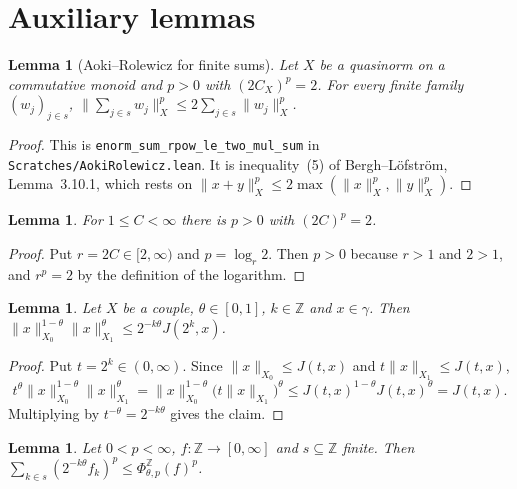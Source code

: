\documentclass[11pt]{article}
\newtheorem{lemma}[theorem]{Lemma}
\theoremstyle{definition}
\theoremstyle{remark}
\newcommand{\norm}[2]{\lVert #1\rVert_{#2}}
\newcommand{\Z}{\mathbb Z}
\begin{document}
\section{Auxiliary lemmas}

\begin{lemma}[Aoki--Rolewicz for finite sums]\label{lem:B}
  Let \(X\) be a quasinorm on a commutative monoid and \(p>0\) with \((2C_X)^p = 2\). For
  every finite family \((w_j)_{j\in s}\),
  \(\norm{\sum_{j\in s} w_j}{X}^p \le 2\sum_{j\in s}\norm{w_j}{X}^p\).
\end{lemma}

\begin{proof}
  This is \texttt{enorm\_sum\_rpow\_le\_two\_mul\_sum} in \texttt{Scratches/AokiRolewicz.lean}.
  It is inequality~(5) of Bergh--L\"ofstr\"om, Lemma~3.10.1, which rests on
  \(\norm{x+y}{X}^p \le 2\max(\norm{x}{X}^p,\norm{y}{X}^p)\).
\end{proof}

\begin{lemma}\label{lem:p}
  For \(1\le C<\infty\) there is \(p>0\) with \((2C)^p = 2\).
\end{lemma}

\begin{proof}
  Put \(r = 2C\in[2,\infty)\) and \(p = \log_r 2\). Then \(p>0\) because \(r>1\) and \(2>1\),
  and \(r^p = 2\) by the definition of the logarithm.
\end{proof}

\begin{lemma}\label{lem:C}
  Let \(X\) be a couple, \(\theta\in[0,1]\), \(k\in\Z\) and \(x\in\gamma\). Then
  \(\norm{x}{X_0}^{1-\theta}\norm{x}{X_1}^{\theta} \le 2^{-k\theta}J(2^k,x)\).
\end{lemma}

\begin{proof}
  Put \(t = 2^k\in(0,\infty)\). Since \(\norm{x}{X_0}\le J(t,x)\) and
  \(t\norm{x}{X_1}\le J(t,x)\),
  \[
    t^\theta\norm{x}{X_0}^{1-\theta}\norm{x}{X_1}^{\theta}
    = \norm{x}{X_0}^{1-\theta}\bigl(t\norm{x}{X_1}\bigr)^{\theta}
    \le J(t,x)^{1-\theta}J(t,x)^{\theta} = J(t,x).
  \]
  Multiplying by \(t^{-\theta} = 2^{-k\theta}\) gives the claim.
\end{proof}

\begin{lemma}\label{lem:D}
  Let \(0<p<\infty\), \(f\colon\Z\to[0,\infty]\) and \(s\subseteq\Z\) finite. Then
  \(\sum_{k\in s}(2^{-k\theta}f_k)^p \le \Phi^{\Z}_{\theta,p}(f)^p\).
\end{lemma}
\end{document}
